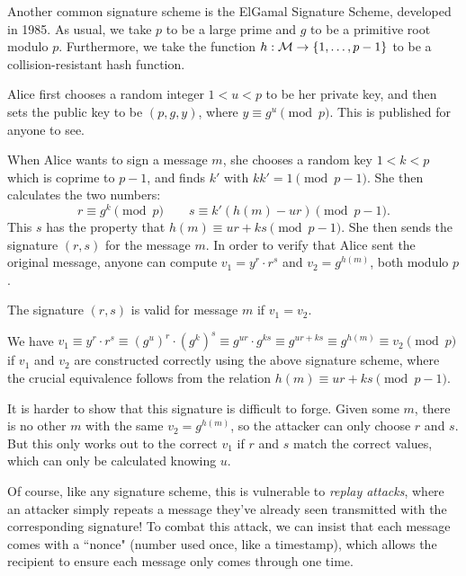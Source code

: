 \documentclass{article}
\begin{document}
Another common signature scheme is the ElGamal Signature Scheme, developed in 1985. As usual, we take $p$ to be a large prime and $g$ to be a primitive root modulo $p$. Furthermore, we take the function $h : \mathcal{M} \to \left\lbrace 1, \dots, p-1 \right\rbrace$ to be a collision-resistant hash function.

Alice first chooses a random integer $1 < u < p$ to be her private key, and then sets the public key to be $(p, g, y)$, where $y \equiv g^u \pmod p$. This is published for anyone to see.

When Alice wants to sign a message $m$, she chooses a random key $1 < k < p$ which is coprime to $p-1$, and finds $k'$ with $kk' = 1 \pmod{p-1}$. She then calculates the two numbers:
\[
r \equiv g^k \pmod p
\qquad
s \equiv k'(h(m) - ur) \pmod{p-1}.
\]
This $s$ has the property that $h(m) \equiv ur + ks \pmod{p-1}$. She then sends the signature $(r, s)$ for the message $m$. In order to verify that Alice sent the original message, anyone can compute $v_1 = y^r \cdot r^s$ and $v_2 = g^{h(m)}$, both modulo $p$.

\begin{proposition}
    The signature $(r, s)$ is valid for message $m$ if $v_1 = v_2$.
\end{proposition}

\begin{prf}
    We have $v_1 \equiv y^r \cdot r^s \equiv (g^u)^r \cdot (g^k)^s \equiv g^{ur} \cdot g^{ks} \equiv g^{ur + ks} \equiv g^{h(m)} \equiv v_2 \pmod p$ if $v_1$ and $v_2$ are constructed correctly using the above signature scheme, where the crucial equivalence follows from the relation $h(m) \equiv ur + ks \pmod{p-1}$.
    
    It is harder to show that this signature is difficult to forge. Given some $m$, there is no other $m$ with the same $v_2 = g^{h(m)}$, so the attacker can only choose $r$ and $s$. But this only works out to the correct $v_1$ if $r$ and $s$ match the correct values, which can only be calculated knowing $u$.
\end{prf}

\begin{note}
	Of course, like any signature scheme, this is vulnerable to \textit{replay attacks}, where an attacker simply repeats a message they've already seen transmitted with the corresponding signature! To combat this attack, we can insist that each message comes with a ``nonce" (number used once, like a timestamp), which allows the recipient to ensure each message only comes through one time.
\end{note}
\end{document}
